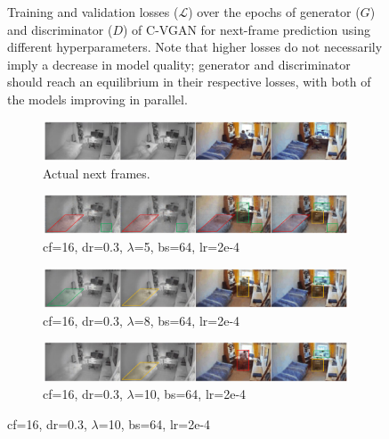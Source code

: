 \begin{figure}
	\caption[C-VGANs' training and validation losses over the epochs. (2)]{Training and validation losses ($\mathcal{L}$) over the epochs of generator ($G$) and discriminator ($D$) of C-VGAN for next-frame prediction using different hyperparameters. Note that higher losses do not necessarily imply a decrease in model quality; generator and discriminator should reach an equilibrium in their respective losses, with both of the models improving in parallel.}
	\label{fig:cvgan_losses_2}
\end{figure}

\begin{figure}
  \centering

	\begin{subfigure}{\textwidth}
		\centering
		\includegraphics[width=\textwidth]{graphics/eval/cvgan_2/qual_basic/actual/actual.pdf}
	  \caption{Actual next frames.}
	  \label{subfig:cvgan_comparison_lambda}
	\end{subfigure}

	\begin{subfigure}{\textwidth}
		\centering
		\includegraphics[width=\textwidth]{graphics/eval/cvgan_2/qual_basic/dfilter-16_ddropout-0.3_lambda-5_batchsize-64_learningrate-0.0002/predicted.pdf}
	  \caption{cf=16, dr=0.3, $\lambda$=5, bs=64, lr=2e-4}
	  \label{subfig:l5-comp-1}
	\end{subfigure}

	\begin{subfigure}{\textwidth}
		\centering
		\includegraphics[width=\textwidth]{graphics/eval/cvgan_2/qual_basic/dfilter-16_ddropout-0.3_lambda-8_batchsize-64_learningrate-0.0002/predicted.pdf}
	  \caption{cf=16, dr=0.3, $\lambda$=8, bs=64, lr=2e-4}
	  \label{subfig:l8-comp-1}
	\end{subfigure}

	\begin{subfigure}{\textwidth}
		\centering
		\includegraphics[width=\textwidth]{graphics/eval/cvgan_2/qual_basic/dfilter-16_ddropout-0.3_lambda-10_batchsize-64_learningrate-0.0002/predicted.pdf}
	  \caption{cf=16, dr=0.3, $\lambda$=10, bs=64, lr=2e-4}
	  \label{subfig:l10-comp-1}
	\end{subfigure}


\end{figure}
